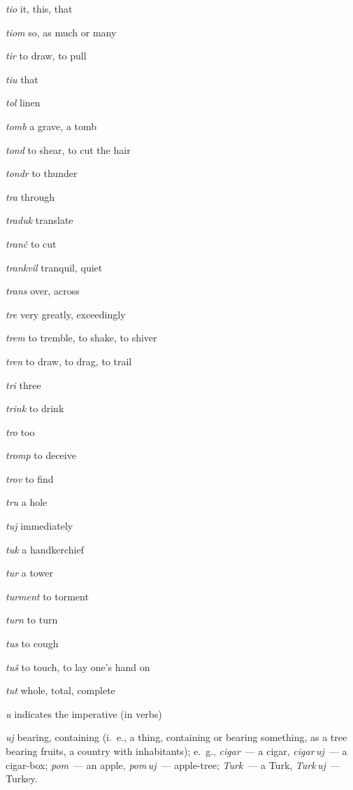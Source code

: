 \begin{landscape}
\begin{multicols}{5}
\begin{outdent}{1em}
\emph{tio}  it, this, that

\emph{tiom}  so, as much or many

\emph{tir } to draw, to pull

\emph{tiu } that

\emph{tol}  linen

\emph{tomb } a grave, a tomb

\emph{tond } to shear, to cut the hair

\emph{tondr}  to thunder

\emph{tra}  through

\emph{traduk}  translate

\emph{tranĉ } to cut

\emph{trankvil}  tranquil, quiet

\emph{trans}  over, across

\emph{tre } very greatly, exceedingly

\emph{trem } to tremble, to shake, to shiver

\emph{tren } to draw, to drag, to trail

\emph{tri } three

\emph{trink}  to drink

\emph{tro}  too

\emph{tromp } to deceive

\emph{trov}  to find

\emph{tru } a hole

\emph{tuj}  immediately

\emph{tuk}  a handkerchief

\emph{tur } a tower

\emph{turment}  to torment

\emph{turn} to turn

\emph{tus } to cough

\emph{tuŝ}  to touch, to lay one’s hand on 

\emph{tut } whole, total, complete
\end{outdent}


\begin{outdent}{1em}
\emph{u}  indicates the imperative (in verbs)

\emph{uj}  bearing, containing (i.~e., a thing, containing
or bearing something, as a tree bearing fruits, a country with inhabitants);
e.~g., \emph{cigar\,} — a cigar, \emph{cigar\,uj\,} — a cigar-box; \emph{pom\,} — an apple, \emph{pom\,uj\,} — apple-tree; \emph{Turk\,} — a Turk, \emph{Turk\,uj\,} — Turkey.


\end{outdent}
\end{multicols}
\end{landscape}
